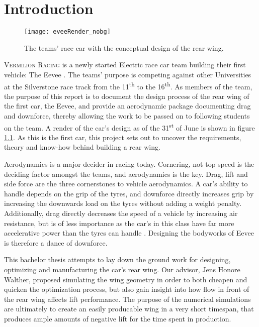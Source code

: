\chapter{Introduction}

  \begin{figure}
    \texttt{[image: eveeRender\_nobg]}
    \caption{The teams' race car with the conceptual design of the rear wing.}
    \label{fig:EeveeRender}
  \end{figure}

  \textsc{Vermilion Racing} is a newly started Electric race car team building their first vehicle: The Eevee \cite{bulba}. The teams' purpose is competing against other Universities at the Silverstone race track from the 11\textsuperscript{th} to the 16\textsuperscript{th}. As members of the team, the purpose of this report is to document the design process of the rear wing of the first car, the Eevee, and provide an aerodynamic package documenting drag and downforce, thereby allowing the work to be passed on to following students on the team. A render of the car's design as of the 31\textsuperscript{st} of June is shown in figure \ref{fig:EeveeRender}. As this is the first car, this project sets out to uncover the requirements, theory and know-how behind building a rear wing.

  Aerodynamics is a major decider in racing today. Cornering, not top speed is the deciding factor amongst the teams, and aerodynamics is the key. Drag, lift and side force are the three cornerstones to vehicle aerodynamics. A car's ability to handle depends on the grip of the tyres, and downforce directly increases grip by increasing the downwards load on the tyres without adding a weight penalty. Additionally, drag directly decreases the speed of a vehicle by increasing air resistance, but is of less importance as the car's in this class have far more accelerative power than the tyres can handle \cite{jkatz}. Designing the bodyworks of Eevee is therefore a dance of downforce.

  This bachelor thesis attempts to lay down the ground work for designing, optimizing and manufacturing the car's rear wing. Our advisor, Jens Honore Walther, proposed simulating the wing geometry in order to both cheapen and quicken the optimization process, but also gain insight into how flow in front of the rear wing affects lift performance. The purpose of the numerical simulations are ultimately to create an easily producable wing in a very short timespan, that produces ample amounts of negative lift for the time spent in production. 

